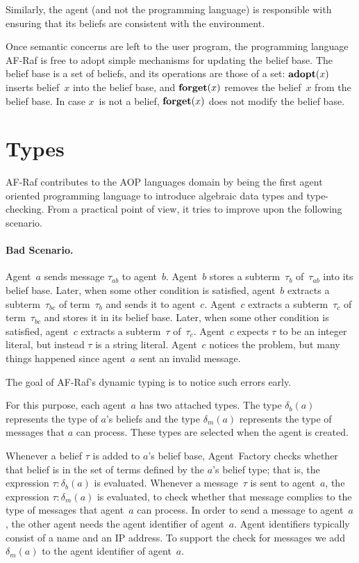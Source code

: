 \documentclass[a4paper,12pt,oneside,fleqn]{book} %
\newcommand{\rg}[1]{\marginpar{\tiny\raggedright\textcolor{blue}{\bf rg:} #1}}
\renewcommand{\rg}{}
\begin{document}
Similarly, the agent (and not the programming language) is responsible with
ensuring that its beliefs are consistent with the environment.

Once semantic concerns are left to the user program, the programming
language AF-Raf is free to adopt simple mechanisms for updating the belief
base.  The belief base is a set of beliefs, and its operations are those of
a set:  ${\bf adopt}(x)$ inserts belief~$x$ into the belief base, and ${\bf
forget}(x)$ removes the belief~$x$ from the belief base.  In case $x$~is
not a belief, ${\bf forget}(x)$ does not modify the belief base.

\section{Types}\label{sec:types} %

AF-Raf contributes to the AOP languages domain by being the first agent
oriented programming language to introduce algebraic data types and
type-checking. From a practical point of view, it tries to improve
upon the following scenario.

\paragraph{Bad Scenario.}

Agent~$a$ sends message $\tau_{ab}$ to agent~$b$. Agent~$b$ stores a
subterm~$\tau_b$ of~$\tau_{ab}$ into its belief base. Later, when some
other condition is satisfied, agent~$b$ extracts a subterm~$\tau_{bc}$ of
term~$\tau_b$ and sends it to agent~$c$. Agent~$c$ extracts a
subterm~$\tau_c$ of term~$\tau_{bc}$ and stores it in its belief base.
Later, when some other condition is satisfied, agent~$c$ extracts a
subterm~$\tau$ of~$\tau_c$. Agent~$c$ expects $\tau$ to be an integer
literal, but instead $\tau$ is a string literal. Agent~$c$ notices the
problem, but many things happened since agent~$a$ sent an invalid message.

The goal of AF-Raf's dynamic typing is to notice such errors early.

For this purpose, each agent~$a$ has two attached types. The type $\delta_b(a)$
represents the type of $a$'s beliefs and the type $\delta_m(a)$ represents the
type of messages that $a$ can process. These types are selected when the agent
is created.

Whenever a belief $\tau$ is added to $a$'s belief base, Agent~Factory checks
whether that belief is in the set of terms defined by the $a$'s belief type;
that is, the expression $\tau:\delta_b(a)$ is evaluated.  Whenever a
message~$\tau$ is sent to agent~$a$, the expression $\tau:\delta_m(a)$ is
evaluated, to check whether that message complies to the type of messages that
agent~$a$ can process. In order to send a message to agent~$a$, the other agent
needs the agent identifier of agent~$a$. Agent identifiers typically consist of
a name and an IP address. To support the check for messages we add
$\delta_m(a)$ to the agent identifier of agent~$a$.
\end{document}
